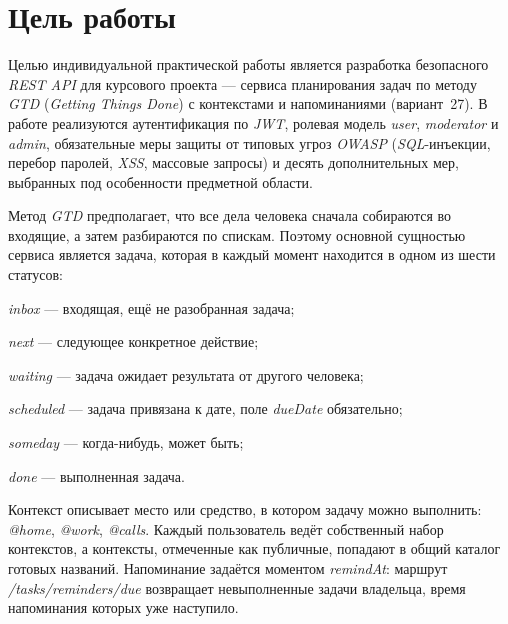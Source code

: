 \documentclass{stp}
\begin{document}

\section{Цель работы}

Целью индивидуальной практической работы является разработка
безопасного \textit{REST API} для курсового проекта — сервиса планирования задач
по методу \textit{GTD} (\textit{Getting Things Done}) с контекстами и напоминаниями
(вариант~27). В работе реализуются аутентификация по \textit{JWT}, ролевая модель
\textit{user}, \textit{moderator} и \textit{admin}, обязательные меры защиты от типовых угроз
\textit{OWASP} (\textit{SQL}-инъекции, перебор паролей, \textit{XSS}, массовые запросы) и десять
дополнительных мер, выбранных под особенности предметной области.

Метод \textit{GTD} предполагает, что все дела человека сначала собираются во
входящие, а затем разбираются по спискам. Поэтому основной сущностью
сервиса является задача, которая в каждый момент находится в одном из
шести статусов:

\begin{stpdash}
  \item \textit{inbox} — входящая, ещё не разобранная задача;
  \item \textit{next} — следующее конкретное действие;
  \item \textit{waiting} — задача ожидает результата от другого человека;
  \item \textit{scheduled} — задача привязана к дате, поле \textit{dueDate} обязательно;
  \item \textit{someday} — когда-нибудь, может быть;
  \item \textit{done} — выполненная задача.
\end{stpdash}

Контекст описывает место или средство, в котором задачу можно
выполнить: \textit{@home}, \textit{@work}, \textit{@calls}. Каждый пользователь ведёт собственный
набор контекстов, а контексты, отмеченные как публичные, попадают в
общий каталог готовых названий. Напоминание задаётся моментом \textit{remindAt}:
маршрут \textit{/tasks/reminders/due} возвращает невыполненные задачи владельца,
время напоминания которых уже наступило.
\end{document}
